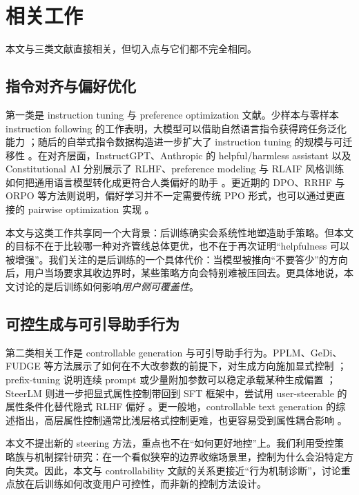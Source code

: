 \documentclass[12pt]{ctexart}
\begin{document}
\section{相关工作}

本文与三类文献直接相关，但切入点与它们都不完全相同。

\subsection{指令对齐与偏好优化}

第一类是 instruction tuning 与 preference optimization 文献。少样本与零样本 instruction following 的工作表明，大模型可以借助自然语言指令获得跨任务泛化能力 \citep{brown2020gpt3,wei2021flan,sanh2021t0,mishra2021naturalinstructions}；随后的自举式指令数据构造进一步扩大了 instruction tuning 的规模与可迁移性 \citep{wang2022selfinstruct}。在对齐层面，InstructGPT、Anthropic 的 helpful/harmless assistant 以及 Constitutional AI 分别展示了 RLHF、preference modeling 与 RLAIF 风格训练如何把通用语言模型转化成更符合人类偏好的助手 \citep{ouyang2022instructgpt,bai2022hh,bai2022constitutional}。更近期的 DPO、RRHF 与 ORPO 等方法则说明，偏好学习并不一定需要传统 PPO 形式，也可以通过更直接的 pairwise optimization 实现 \citep{rafailov2023dpo,yuan2023rrhf,hong2024orpo}。

本文与这类工作共享同一个大背景：后训练确实会系统性地塑造助手策略。但本文的目标不在于比较哪一种对齐管线总体更优，也不在于再次证明“helpfulness 可以被增强”。我们关注的是后训练的一个具体代价：当模型被推向“不要答少”的方向后，用户当场要求其收边界时，某些策略方向会特别难被压回去。更具体地说，本文讨论的是后训练如何影响\emph{用户侧可覆盖性}。

\subsection{可控生成与可引导助手行为}

第二类相关工作是 controllable generation 与可引导助手行为。PPLM、GeDi、FUDGE 等方法展示了如何在不大改参数的前提下，对生成方向施加显式控制 \citep{dathathri2020pplm,krause2021gedi,yang2021fudge}；prefix-tuning 说明连续 prompt 或少量附加参数可以稳定承载某种生成偏置 \citep{li2021prefix}；SteerLM 则进一步把显式属性控制带回到 SFT 框架中，尝试用 user-steerable 的属性条件化替代隐式 RLHF 偏好 \citep{dong2023steerlm}。更一般地，controllable text generation 的综述指出，高层属性控制通常比浅层格式控制更难，也更容易受到属性耦合影响 \citep{zhang2022ctgsurvey}。

本文不提出新的 steering 方法，重点也不在“如何更好地控”上。我们利用受控策略族与机制探针研究：在一个看似狭窄的边界收缩场景里，控制为什么会沿特定方向失灵。因此，本文与 controllability 文献的关系更接近“行为机制诊断”，讨论重点放在后训练如何改变用户可控性，而非新的控制方法设计。
\end{document}
